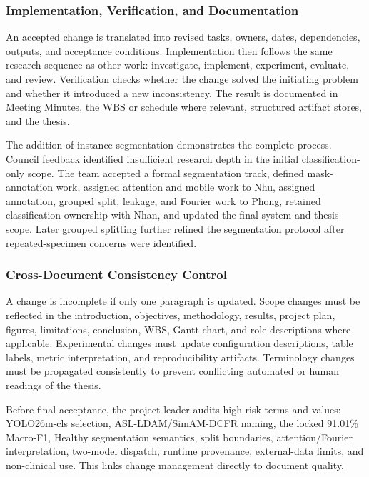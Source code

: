 \documentclass[12pt,a4paper]{report}
\newenvironment{revisionblock}{\begin{snugshade}\noindent}{\end{snugshade}}
\begin{document}
\subsubsection{Implementation, Verification, and Documentation}
An accepted change is translated into revised tasks, owners, dates, dependencies, outputs, and acceptance conditions. Implementation then follows the same research sequence as other work: investigate, implement, experiment, evaluate, and review. Verification checks whether the change solved the initiating problem and whether it introduced a new inconsistency. The result is documented in Meeting Minutes, the WBS or schedule where relevant, structured artifact stores, and the thesis.\par
The addition of instance segmentation demonstrates the complete process. Council feedback identified insufficient research depth in the initial classification-only scope. The team accepted a formal segmentation track, defined mask-annotation work, assigned attention and mobile work to Nhu, assigned annotation, grouped split, leakage, and Fourier work to Phong, retained classification ownership with Nhan, and updated the final system and thesis scope. Later grouped splitting further refined the segmentation protocol after repeated-specimen concerns were identified.\par
\subsubsection{Cross-Document Consistency Control}
A change is incomplete if only one paragraph is updated. Scope changes must be reflected in the introduction, objectives, methodology, results, project plan, figures, limitations, conclusion, WBS, Gantt chart, and role descriptions where applicable. Experimental changes must update configuration descriptions, table labels, metric interpretation, and reproducibility artifacts. Terminology changes must be propagated consistently to prevent conflicting automated or human readings of the thesis.\par
\begin{revisionblock}
Before final acceptance, the project leader audits high-risk terms and values: YOLO26m-cls selection, ASL-LDAM/SimAM-DCFR naming, the locked 91.01\% Macro-F1, Healthy segmentation semantics, split boundaries, attention/Fourier interpretation, two-model dispatch, runtime provenance, external-data limits, and non-clinical use. This links change management directly to document quality.
\end{revisionblock}
\end{document}
